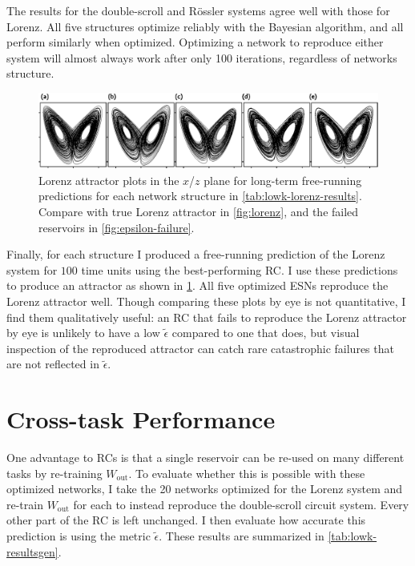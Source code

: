 The results for the double-scroll and R{\"{o}}ssler systems agree well
with those for Lorenz. All five structures optimize reliably with the
Bayesian algorithm, and all perform similarly when
optimized. Optimizing a network to reproduce either system will almost
always work after only 100 iterations, regardless of networks
structure.

\begin{figure}
  \includegraphics[width=\textwidth]{figures/lowk-attractors}
  \caption{Lorenz attractor plots in the $x$/$z$ plane for long-term
    free-running predictions for each network structure in
    \cref{tab:lowk-lorenz-results}. Compare with true Lorenz attractor
    in \cref{fig:lorenz}, and the failed reservoirs in
    \cref{fig:epsilon-failure}.}%
  \label{fig:lowk-attractors}
\end{figure}

Finally, for each structure I produced a free-running prediction of
the Lorenz system for $100$ time units using the best-performing RC.\@
I use these predictions to produce an attractor as shown in
\cref{fig:lowk-attractors}. All five optimized ESNs reproduce the
Lorenz attractor well. Though comparing these plots by eye is not
quantitative, I find them qualitatively useful: an RC that fails to
reproduce the Lorenz attractor by eye is unlikely to have a low
$\tilde{\epsilon}$ compared to one that does, but visual inspection of
the reproduced attractor can catch rare catastrophic failures that are
not reflected in $\tilde{\epsilon}$.

\section{Cross-task Performance}

One advantage to RCs is that a single reservoir can be re-used on many
different tasks by re-training $W_{\text{out}}$. To evaluate whether
this is possible with these optimized networks, I take the 20 networks
optimized for the Lorenz system and re-train $W_{\text{out}}$ for each
to instead reproduce the double-scroll circuit system. Every other
part of the RC is left unchanged. I then evaluate how accurate this
prediction is using the metric $\tilde{\epsilon}$. These results are
summarized in \cref{tab:lowk-resultsgen}.

